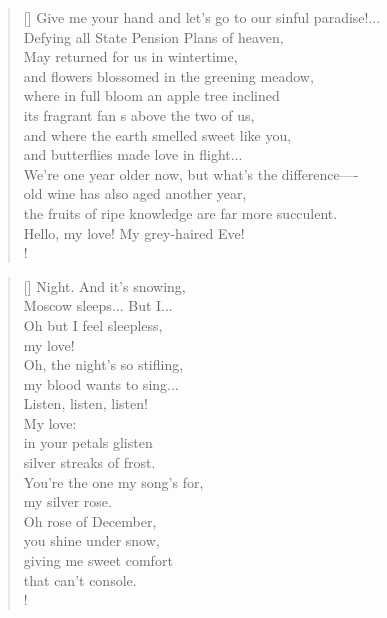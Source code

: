 \documentclass[]{article}
\begin{document}
\settowidth{\versewidth}{ Give me your hand and let's go to our sinful paradise!     }
\begin{verse}[\versewidth]
Give me your hand and let's go to our sinful paradise!... \\
Defying all State Pension Plans of heaven,\\
May returned for us in wintertime,\\
and flowers blossomed in the greening meadow,\\
where in full bloom an apple tree inclined\\
its fragrant fan s above the two of us,\\
and where the earth smelled sweet like you,\\
and butterflies made love in flight...\\
We're one year older now, but what's the difference—- \\
old wine has also aged another year,\\
the fruits of ripe knowledge are far more succulent.\\
Hello, my love! My grey-haired Eve!\\!
\end{verse}
\newpage 

\settowidth{\versewidth}{Night. And it's snowing }
\begin{verse}[\versewidth]
Night. And it's snowing,\\
Moscow sleeps... But I... \\
Oh but I feel sleepless,\\
my love!\\
Oh, the night's so stifling,\\
my blood wants to sing... \\
Listen, listen, listen!\\
My love:\\
in your petals glisten\\
silver streaks of frost.\\
You're the one my song's for,\\
my silver rose.\\
Oh rose of December,\\
you shine under snow,\\
giving me sweet comfort\\
that can't console.\\!
\end{verse}
\bigskip \bigskip
\end{document}
